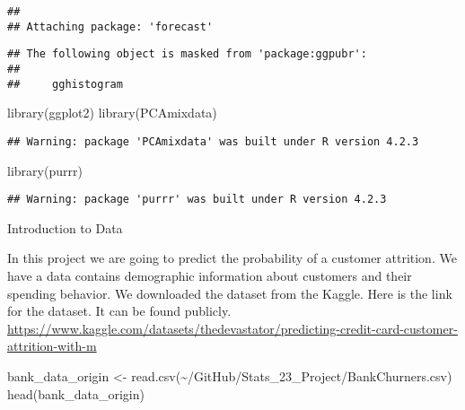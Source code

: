 \documentclass[
]{article}
\newenvironment{Shaded}{\begin{snugshade}}{\end{snugshade}}
\newcommand{\FunctionTok}[1]{\textcolor[rgb]{0.00,0.00,0.00}{#1}}
\newcommand{\NormalTok}[1]{#1}
\newcommand{\OtherTok}[1]{\textcolor[rgb]{0.56,0.35,0.01}{#1}}
\newcommand{\StringTok}[1]{\textcolor[rgb]{0.31,0.60,0.02}{#1}}
\begin{document}
\begin{verbatim}
## 
## Attaching package: 'forecast'
\end{verbatim}

\begin{verbatim}
## The following object is masked from 'package:ggpubr':
## 
##     gghistogram
\end{verbatim}

\begin{Shaded}
\begin{Highlighting}[]
\FunctionTok{library}\NormalTok{(ggplot2)}
\FunctionTok{library}\NormalTok{(PCAmixdata)}
\end{Highlighting}
\end{Shaded}

\begin{verbatim}
## Warning: package 'PCAmixdata' was built under R version 4.2.3
\end{verbatim}

\begin{Shaded}
\begin{Highlighting}[]
\FunctionTok{library}\NormalTok{(purrr)}
\end{Highlighting}
\end{Shaded}

\begin{verbatim}
## Warning: package 'purrr' was built under R version 4.2.3
\end{verbatim}

Introduction to Data

In this project we are going to predict the probability of a customer
attrition. We have a data contains demographic information about
customers and their spending behavior. We downloaded the dataset from
the Kaggle. Here is the link for the dataset. It can be found publicly.
\url{https://www.kaggle.com/datasets/thedevastator/predicting-credit-card-customer-attrition-with-m}

\begin{Shaded}
\begin{Highlighting}[]
\NormalTok{bank\_data\_origin }\OtherTok{\textless{}{-}} \FunctionTok{read.csv}\NormalTok{(}\StringTok{\textquotesingle{}\textasciitilde{}/GitHub/Stats\_23\_Project/BankChurners.csv\textquotesingle{}}\NormalTok{)}
\FunctionTok{head}\NormalTok{(bank\_data\_origin)}
\end{Highlighting}
\end{Shaded}
\end{document}
